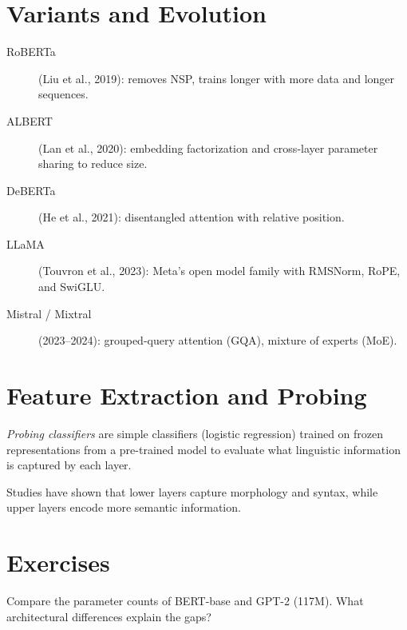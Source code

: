 \section{Variants and Evolution}
\label{sec:pre:variants}

\begin{description}
    \item[RoBERTa] (Liu et al., 2019): removes NSP, trains longer with more
          data and longer sequences.
    \item[ALBERT] (Lan et al., 2020): embedding factorization and cross-layer
          parameter sharing to reduce size.
    \item[DeBERTa] (He et al., 2021): disentangled attention with relative
          position.
    \item[LLaMA] (Touvron et al., 2023): Meta's open model family with
          RMSNorm, RoPE, and SwiGLU.
    \item[Mistral / Mixtral] (2023--2024): grouped-query attention (GQA),
          mixture of experts (MoE).
\end{description}

\section{Feature Extraction and Probing}
\label{sec:pre:probing}

\begin{definition}
\emph{Probing classifiers} are simple classifiers (logistic regression)
trained on frozen representations from a pre-trained model to evaluate what
linguistic information is captured by each layer.
\end{definition}

Studies have shown that lower layers capture morphology and syntax, while upper
layers encode more semantic information.

\section{Exercises}
\label{sec:pre:exercises}

\begin{exercise}[$\star$]
Compare the parameter counts of BERT-base and GPT-2 (117M). What architectural
differences explain the gaps?
\end{exercise}

